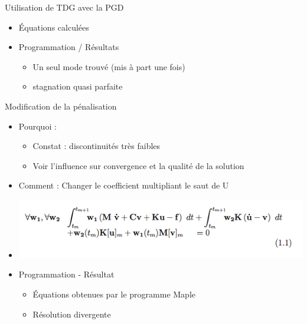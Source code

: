 \documentclass[10pt,a4paper]{beamer}
\begin{document}
\begin{frame}{Utilisation de TDG avec la PGD}
	\begin{itemize}
		\item Équations calculées
		\item Programmation / Résultats
			\begin{itemize}
				\item Un seul mode trouvé (mis à part une fois)
				\item stagnation quasi parfaite
			\end{itemize}
	\end{itemize}
\end{frame}

\begin{frame}{Modification de la pénalisation}
	\begin{itemize}
		\item Pourquoi : 
			\begin{itemize}
				\item Constat : discontinuités très faibles
				\item Voir l'influence sur convergence et la qualité de la solution
			\end{itemize}
		\item Comment : Changer le coefficient multipliant le saut de U
		\item \includegraphics[width=0.8\linewidth]{TDG_1-1.png}
		\item Programmation - Résultat
			\begin{itemize}
				\item Équations obtenues par le programme Maple
				\item Résolution divergente
			\end{itemize}
	\end{itemize}
\end{frame}
\end{document}

